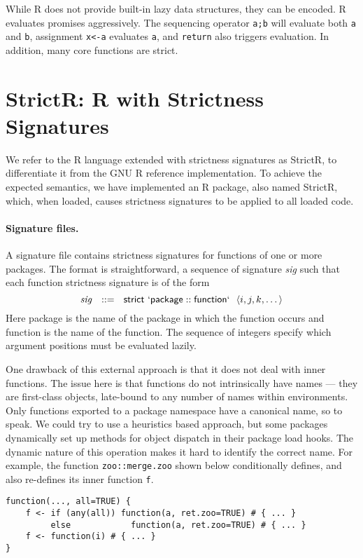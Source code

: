 \documentclass[review,nonacm,screen,acmsmall,anonymous=true]{acmart}
\newcommand{\authorcomment}[3]{}
\newcommand{\OF}[1]{\authorcomment{magenta}{OF}{#1}}
\newcommand{\code}[1]{\lstinline |#1|\xspace}
\newcommand{\strictr}{{\sf StrictR}\xspace}
\begin{document}
\noindent
While R does not provide built-in lazy data structures, they can be encoded. R
evaluates promises aggressively. The sequencing operator \code{a;b} will
evaluate both \code a and \code b, assignment \code{x<-a} evaluates \code a, and
\code{return} also triggers evaluation. In addition, many core functions are
strict.


\section{StrictR: R with Strictness Signatures}\label{sec:strictr}

We refer to the R language extended with strictness signatures as \strictr, to
differentiate it from the GNU R reference implementation. To achieve the
expected semantics, we have implemented an R package, also named \strictr,
which, when loaded, causes strictness signatures to be applied to all loaded
code.

\paragraph{Signature files.}
A signature file contains strictness signatures for functions of one or more
packages. The format is straightforward, a sequence of signature \emph{sig}
such that each function strictness signature is of the form
%
\[
\mathit{sig}~~::=~~\mathsf{strict}~\mathsf{`package}::\mathsf{function`}~~\langle i, j, k, \dots\rangle
\]
%
Here {\sf package} is the name of the package in which the function occurs and
{\sf function} is the name of the function. The sequence of integers specify
which argument positions must be evaluated lazily.

One drawback of this external approach is that it does not deal with inner
functions. The issue here is that functions do not intrinsically have names ---
they are first-class objects, late-bound to any number of names within environments.
Only functions exported to a package namespace have a canonical name, so to
speak. \OF{Is it a correct representation that StrictR can only annotate
functions in package namespaces?}
We could try to use a heuristics based approach, but some packages dynamically set up
methods for object dispatch in their package load hooks. The dynamic nature of
this operation makes it hard to identify the correct name.
For example, the function \code{zoo::merge.zoo} shown below
conditionally defines, and also re-defines its inner function \code{f}.

\begin{lstlisting}
function(..., all=TRUE) {
    f <- if (any(all)) function(a, ret.zoo=TRUE) # { ... }
         else            function(a, ret.zoo=TRUE) # { ... }
    f <- function(i) # { ... }
}
\end{lstlisting}
\end{document}
